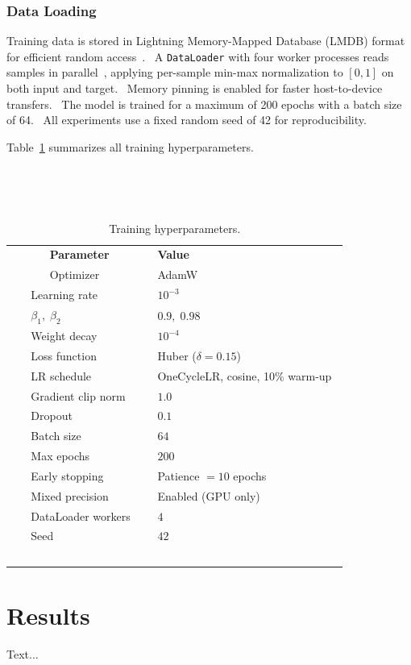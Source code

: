 \documentclass[12pt,a4paper]{report}
\begin{document}
\subsubsection{Data Loading}

Training data is stored in Lightning Memory-Mapped Database (LMDB) format for efficient random access~\cite{lmdb}.  A \texttt{DataLoader} with four worker processes reads samples in parallel~\cite{paszke2019}, applying per-sample min-max normalization to $[0,1]$ on both input and target.  Memory pinning is enabled for faster host-to-device transfers.  The model is trained for a maximum of 200 epochs with a batch size of 64.  All experiments use a fixed random seed of 42 for reproducibility.

Table~\ref{tab:training-params} summarizes all training hyperparameters.

\begin{table}[htbp]
  \centering
  \caption{Training hyperparameters.}
  \label{tab:training-params}
  \begin{tabular}{@{}ll@{}}
    \toprule
    \textbf{Parameter} & \textbf{Value} \\
    \midrule
    Optimizer          & AdamW~\cite{loshchilov2019} \\
    Learning rate      & $10^{-3}$ \\
    $\beta_1,\;\beta_2$ & $0.9,\;0.98$ \\
    Weight decay       & $10^{-4}$ \\
    Loss function      & Huber ($\delta=0.15$)~\cite{huber1964} \\
    LR schedule        & OneCycleLR, cosine, 10\% warm-up~\cite{smith2019} \\
    Gradient clip norm & $1.0$ \\
    Dropout            & $0.1$ \\
    Batch size         & $64$ \\
    Max epochs         & $200$ \\
    Early stopping     & Patience $= 10$ epochs \\
    Mixed precision    & Enabled (GPU only) \\
    DataLoader workers & $4$ \\
    Seed               & $42$ \\
    \bottomrule
  \end{tabular}
\end{table}

\section{Results}
Text...
\end{document}
